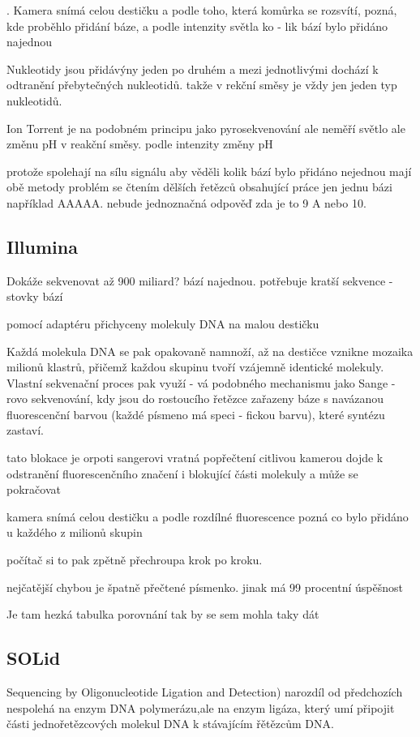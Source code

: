 \documentclass[czech,DP]{thesiskiv}
\begin{document}
. Kamera
snímá celou destičku a podle toho, která
komůrka se rozsvítí, pozná, kde proběhlo
přidání báze, a podle intenzity světla ko -
lik bází bylo přidáno najednou

Nukleotidy jsou přidávýny jeden po druhém a mezi jednotlivými dochází k odtranění přebytečných nukleotidů.
takže v rekční směsy je vždy jen jeden typ nukleotidů.

Ion Torrent je na podobném principu jako pyrosekvenování
ale neměří světlo ale změnu pH v reakční směsy.
podle intenzity změny pH

protože spolehají na sílu signálu aby věděli kolik bází bylo přidáno  nejednou mají obě metody problém se čtením dělších řetězců obsahující práce jen jednu bázi například AAAAA. nebude jednoznačná odpověď zda je to 9 A nebo 10.

\subsection{Illumina}
Dokáže sekvenovat až 900 miliard? bází najednou. 
potřebuje kratší sekvence - stovky bází

pomocí adaptéru přichyceny molekuly DNA na malou destičku

Každá molekula DNA se pak opakovaně namnoží, až na destičce vznikne
mozaika milionů klastrů, přičemž každou
skupinu tvoří vzájemně identické molekuly. Vlastní sekvenační proces pak využí -
vá podobného mechanismu jako Sange -
rovo sekvenování, kdy jsou do rostoucího
řetězce zařazeny báze s navázanou fluorescenční barvou (každé písmeno má speci -
fickou barvu), které syntézu zastaví.

tato blokace je orpoti sangerovi vratná
 popřečtení citlivou kamerou dojde k odstranění fluorescenčního značení i blokující části molekuly
 a může se pokračovat
 
 kamera snímá celou destičku
 a podle rozdílné fluorescence pozná co bylo přidáno u každého z milionů skupin
 
 počítač si to pak zpětně přechroupa krok po kroku.
 

nejčatější chybou je špatně přečtené písmenko. 
jinak má 99 procentní úspěšnost

Je tam hezká tabulka porovnání tak by se sem mohla taky dát

\subsection{SOLid}
Sequencing by Oligonucleotide Ligation and Detection)
narozdíl od předchozích nespolehá na enzym DNA polymerázu,ale na enzym ligáza, který umí připojit části jednořetězcových molekul DNA k stávajícím řětězcům DNA.
\end{document}
